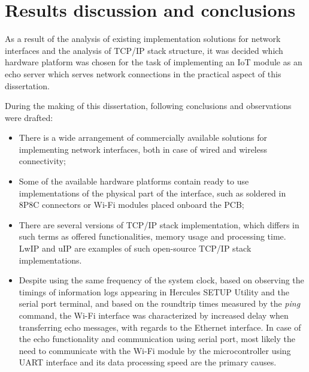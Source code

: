 \chapter{Results discussion and conclusions}
As a result of the analysis of existing implementation solutions for network interfaces and the analysis of TCP/IP stack structure, it was decided which hardware platform was chosen for the task of implementing an IoT module as an echo server which serves network connections in the practical aspect of this dissertation.

During the making of this dissertation, following conclusions and observations were drafted:

\begin{itemize}
	\item [$\bullet$] There is a wide arrangement of commercially available solutions for implementing network interfaces, both in case of wired and wireless connectivity;
    \item [$\bullet$] Some of the available hardware platforms contain ready to use implementations of the physical part of the interface, such as soldered in 8P8C connectors or Wi-Fi modules placed onboard the PCB;
    \item [$\bullet$] There are several versions of TCP/IP stack implementation, which differs in such terms as offered functionalities, memory usage and processing time. LwIP and uIP are examples of such open-source TCP/IP stack implementations.
    \item [$\bullet$] Despite using the same frequency of the system clock, based on observing the timings of information logs appearing in Hercules SETUP Utility and the serial port terminal, and based on the roundtrip times measured by the \emph{ping} command, the Wi-Fi interface was characterized by increased delay when transferring echo messages, with regards to the Ethernet interface. In case of the echo functionality and communication using serial port, most likely the need to communicate with the Wi-Fi module by the microcontroller using UART interface and its data processing speed are the primary causes.
\end{itemize}
